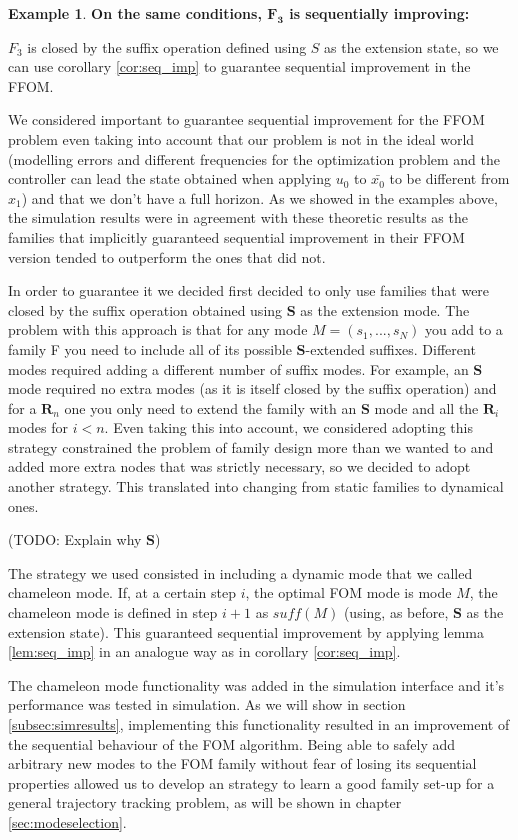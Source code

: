 \documentclass[12,twoside]{TFG-GM}
\theoremstyle{definition}
\newtheorem{example}[theorem]{Example}
\theoremstyle{remark}
\newcommand*\diff[1]{\bar{#1}}
\begin{document}
\begin{example} \textbf{On the same conditions, $\boldsymbol{F_3}$ is sequentially improving:}

$F_3$ is closed by the suffix operation defined using $S$ as the extension state, so we can use corollary \ref{cor:seq_imp} to guarantee sequential improvement in the FFOM.
\end{example}

We considered important to guarantee sequential improvement for the FFOM problem even taking into account that our problem is not in the ideal world (modelling errors and different frequencies for the optimization problem and the controller can lead the state obtained when applying $u_0$ to $\diff{x_0}$ to be different from $x_1$) and that we don't have a full horizon. As we showed in the examples above, the simulation results were in agreement with these theoretic results as the families that implicitly guaranteed sequential improvement in their FFOM version tended to outperform the ones that did not.

In order to guarantee it we decided first decided to only use families that were closed by the suffix operation obtained using $\textbf{S}$ as the extension mode. The problem with this approach is that for any mode $M = (s_1, ..., s_N)$ you add to a family F you need to include all of its possible $\textbf{S}$-extended suffixes. Different modes required adding a different number of suffix modes. For example, an $\textbf{S}$ mode required no extra modes (as it is itself closed by the suffix operation) and for a $\textbf{R}_n$ one you only need to extend the family with an $\textbf{S}$ mode and all the $\textbf{R}_i$ modes for $i < n$. Even taking this into account, we considered adopting this strategy constrained the problem of family design more than we wanted to and added more extra nodes that was strictly necessary, so we decided to adopt another strategy. This translated into changing from static families to dynamical ones.

(TODO: Explain why $\textbf{S}$)

The strategy we used consisted in including a dynamic mode that we called chameleon mode. If, at a certain step $i$, the optimal FOM mode is mode $M$, the chameleon mode is defined in step $i + 1$ as $suff(M)$ (using, as before, $\textbf{S}$ as the extension state). This guaranteed sequential improvement by applying lemma \ref{lem:seq_imp} in an analogue way as in corollary \ref{cor:seq_imp}.

The chameleon mode functionality was added in the simulation interface and it's performance was tested in simulation. As we will show in section \ref{subsec:simresults}, implementing this functionality resulted in an improvement of the sequential behaviour of the FOM algorithm. Being able to safely add arbitrary new modes to the FOM family without fear of losing its sequential properties allowed us to develop an strategy to learn a good family set-up for a general trajectory tracking problem, as will be shown in chapter \ref{sec:modeselection}.
\end{document}

